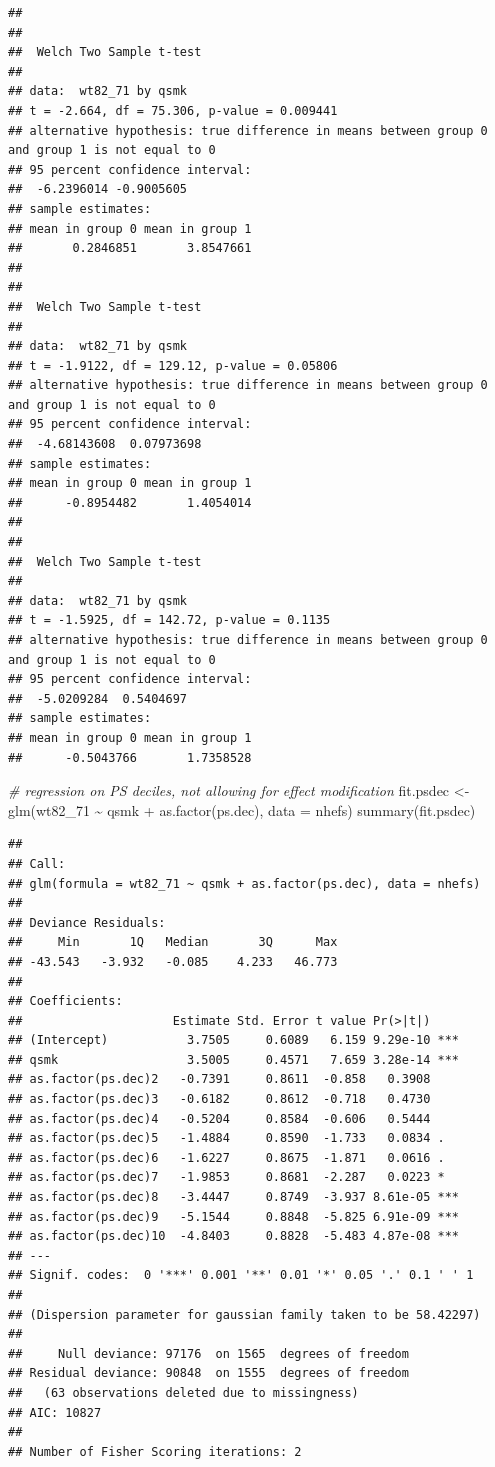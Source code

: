 \documentclass[
  10pt,
]{book}
\newenvironment{Shaded}{\begin{snugshade}}{\end{snugshade}}
\newcommand{\AttributeTok}[1]{\textcolor[rgb]{0.77,0.63,0.00}{#1}}
\newcommand{\CommentTok}[1]{\textcolor[rgb]{0.56,0.35,0.01}{\textit{#1}}}
\newcommand{\FunctionTok}[1]{\textcolor[rgb]{0.00,0.00,0.00}{#1}}
\newcommand{\NormalTok}[1]{#1}
\newcommand{\OtherTok}[1]{\textcolor[rgb]{0.56,0.35,0.01}{#1}}
\newcommand{\SpecialCharTok}[1]{\textcolor[rgb]{0.00,0.00,0.00}{#1}}
\begin{document}
\begin{verbatim}
## 
## 
##  Welch Two Sample t-test
## 
## data:  wt82_71 by qsmk
## t = -2.664, df = 75.306, p-value = 0.009441
## alternative hypothesis: true difference in means between group 0 and group 1 is not equal to 0
## 95 percent confidence interval:
##  -6.2396014 -0.9005605
## sample estimates:
## mean in group 0 mean in group 1 
##       0.2846851       3.8547661 
## 
## 
##  Welch Two Sample t-test
## 
## data:  wt82_71 by qsmk
## t = -1.9122, df = 129.12, p-value = 0.05806
## alternative hypothesis: true difference in means between group 0 and group 1 is not equal to 0
## 95 percent confidence interval:
##  -4.68143608  0.07973698
## sample estimates:
## mean in group 0 mean in group 1 
##      -0.8954482       1.4054014 
## 
## 
##  Welch Two Sample t-test
## 
## data:  wt82_71 by qsmk
## t = -1.5925, df = 142.72, p-value = 0.1135
## alternative hypothesis: true difference in means between group 0 and group 1 is not equal to 0
## 95 percent confidence interval:
##  -5.0209284  0.5404697
## sample estimates:
## mean in group 0 mean in group 1 
##      -0.5043766       1.7358528
\end{verbatim}

\begin{Shaded}
\begin{Highlighting}[]
\CommentTok{\# regression on PS deciles, not allowing for effect modification}
\NormalTok{fit.psdec }\OtherTok{\textless{}{-}} \FunctionTok{glm}\NormalTok{(wt82\_71 }\SpecialCharTok{\textasciitilde{}}\NormalTok{ qsmk }\SpecialCharTok{+} \FunctionTok{as.factor}\NormalTok{(ps.dec), }\AttributeTok{data =}\NormalTok{ nhefs)}
\FunctionTok{summary}\NormalTok{(fit.psdec)}
\end{Highlighting}
\end{Shaded}

\begin{verbatim}
## 
## Call:
## glm(formula = wt82_71 ~ qsmk + as.factor(ps.dec), data = nhefs)
## 
## Deviance Residuals: 
##     Min       1Q   Median       3Q      Max  
## -43.543   -3.932   -0.085    4.233   46.773  
## 
## Coefficients:
##                     Estimate Std. Error t value Pr(>|t|)    
## (Intercept)           3.7505     0.6089   6.159 9.29e-10 ***
## qsmk                  3.5005     0.4571   7.659 3.28e-14 ***
## as.factor(ps.dec)2   -0.7391     0.8611  -0.858   0.3908    
## as.factor(ps.dec)3   -0.6182     0.8612  -0.718   0.4730    
## as.factor(ps.dec)4   -0.5204     0.8584  -0.606   0.5444    
## as.factor(ps.dec)5   -1.4884     0.8590  -1.733   0.0834 .  
## as.factor(ps.dec)6   -1.6227     0.8675  -1.871   0.0616 .  
## as.factor(ps.dec)7   -1.9853     0.8681  -2.287   0.0223 *  
## as.factor(ps.dec)8   -3.4447     0.8749  -3.937 8.61e-05 ***
## as.factor(ps.dec)9   -5.1544     0.8848  -5.825 6.91e-09 ***
## as.factor(ps.dec)10  -4.8403     0.8828  -5.483 4.87e-08 ***
## ---
## Signif. codes:  0 '***' 0.001 '**' 0.01 '*' 0.05 '.' 0.1 ' ' 1
## 
## (Dispersion parameter for gaussian family taken to be 58.42297)
## 
##     Null deviance: 97176  on 1565  degrees of freedom
## Residual deviance: 90848  on 1555  degrees of freedom
##   (63 observations deleted due to missingness)
## AIC: 10827
## 
## Number of Fisher Scoring iterations: 2
\end{verbatim}
\end{document}
